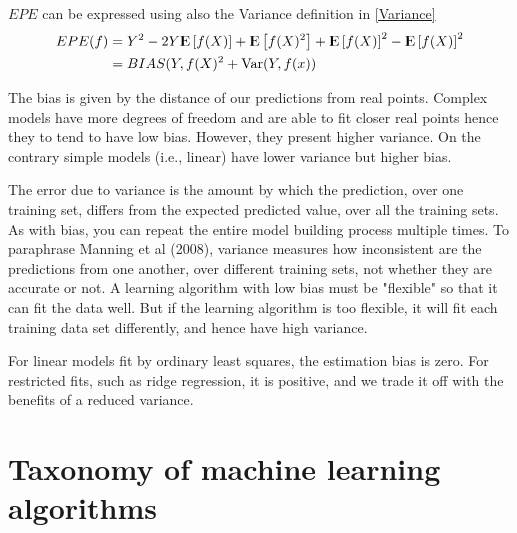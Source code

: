 \documentclass[12pt, letterpaper]{article}
\theoremstyle{definition}
\newcommand{\E}{{\rm I\kern-.3em E}}
\newcommand{\Var}{\mathrm{Var}}
\begin{document}
$EPE$ can be expressed using also the Variance definition in \ref{Variance}
\begin{equation}
\begin{aligned}
\label{biasVar}
EPE(f) &=  Y^2 - 2  Y \E\left[ f(X)\right] + \E\left[ f(X)^2\right] +\E\left[f(X)\right]^2-\E\left[f(X)\right]^2\\
&= BIAS(Y, f(X)^2 + \Var(Y, f(x))
\end{aligned}
\end{equation}

The bias is given by the distance of our predictions from real points. Complex models have more degrees of freedom and are able to fit closer real points hence they to tend to have low bias. However, they present higher variance. On the contrary simple models (i.e., linear) have lower variance but higher bias.

The error due to variance is the amount by which the prediction, over one training set, differs from the expected predicted value, over all the training sets. As with bias, you can repeat the entire model building process multiple times. To paraphrase Manning et al (2008), variance measures how inconsistent are the predictions from one another, over different training sets, not whether they are accurate or not.  A learning algorithm with low bias must be "flexible" so that it can fit the data well. But if the learning algorithm is too flexible, it will fit each training data set differently, and hence have high variance.

For linear models fit by ordinary least squares, the estimation bias is zero. For restricted fits, such as ridge regression, it is positive, and we trade it off with the benefits of a reduced variance.

\section{Taxonomy of machine learning algorithms}
\end{document}
